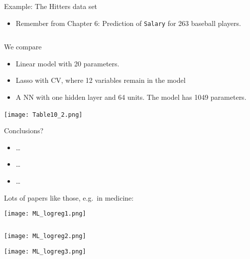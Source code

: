 \documentclass[
  10pt,
  ignorenonframetext,
]{beamer}
\providecommand{\tightlist}{%
  \setlength{\itemsep}{0pt}\setlength{\parskip}{0pt}}
\begin{document}
\begin{frame}[fragile]
\begin{block}{Example: The Hitters data set}
\protect\hypertarget{example-the-hitters-data-set}{}
\(~\)

\begin{itemize}
\tightlist
\item
  Remember from Chapter 6: Prediction of \texttt{Salary} for 263
  baseball players.
\end{itemize}

\(~\)

We compare

\vspace{2mm}

\begin{itemize}
\tightlist
\item
  Linear model with 20 parameters.
\item
  Lasso with CV, where 12 variables remain in the model
\item
  A NN with one hidden layer and 64 units. The model has 1049
  parameters.
\end{itemize}
\end{block}
\end{frame}

\begin{frame}
\texttt{[image: Table10\_2.png]} \(~\)

Conclusions?

\begin{itemize}
\tightlist
\item
  \ldots{}
\item
  \ldots{}
\item
  \ldots{}
\end{itemize}
\end{frame}

\begin{frame}
Lots of papers like those, e.g.~in medicine:

\centering

\texttt{[image: ML\_logreg1.png]}

\(~\)

\texttt{[image: ML\_logreg2.png]}

\texttt{[image: ML\_logreg3.png]}
\end{frame}
\end{document}
